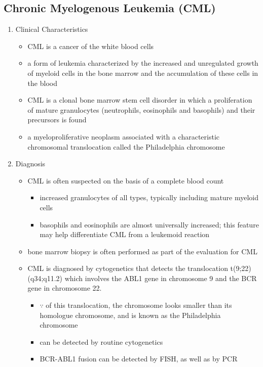 \documentclass[12pt]{scrartcl}
\begin{document}
\subsection{Chronic Myelogenous Leukemia (CML)}
\label{sec:org701d238}
\begin{enumerate}
\item Clinical Characteristics
\label{sec:org9d44696}
\begin{itemize}
\item CML is a cancer of the white blood cells
\item a form of leukemia characterized by the increased and unregulated
growth of myeloid cells in the bone marrow and the accumulation of
these cells in the blood
\item CML is a clonal bone marrow stem cell disorder in which a
proliferation of mature granulocytes (neutrophils, eosinophils and
basophils) and their precursors is found
\item a myeloproliferative neoplasm associated with a characteristic
chromosomal translocation called the Philadelphia chromosome
\end{itemize}

\item Diagnosis
\label{sec:orgfb0cd7a}
\begin{itemize}
\item CML is often suspected on the basis of a complete blood count
\begin{itemize}
\item increased granulocytes of all types, typically including mature myeloid cells
\item basophils and eosinophils are almost universally increased; this
feature may help differentiate CML from a leukemoid reaction
\end{itemize}
\item bone marrow biopsy is often performed as part of the evaluation for CML
\item CML is diagnosed by cytogenetics that detects the translocation
t(9;22)(q34;q11.2) which involves the ABL1 gene in chromosome 9 and
the BCR gene in chromosome 22.
\begin{itemize}
\item \(\because\) of this translocation, the chromosome looks smaller than
its homologue chromosome, and is known as the Philadelphia
chromosome
\item can be detected by routine cytogenetics
\item BCR-ABL1 fusion can be detected by FISH, as well as by PCR
\end{itemize}
\end{itemize}


\end{enumerate}
\end{document}
